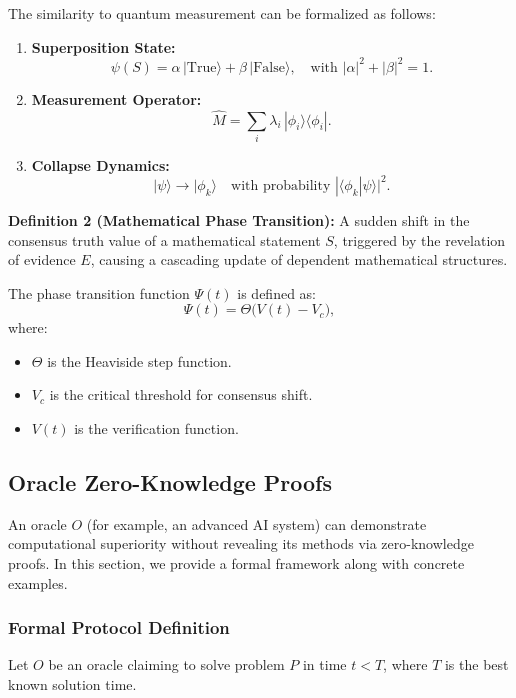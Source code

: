 \documentclass[11pt]{article}
\begin{document}
The similarity to quantum measurement can be formalized as follows:
\begin{enumerate}[label=(\arabic*)]
    \item \textbf{Superposition State:} 
    \[
    \psi(S) = \alpha\,| \text{True} \rangle + \beta\,| \text{False} \rangle, \quad \text{with } |\alpha|^2 + |\beta|^2 = 1.
    \]
    \item \textbf{Measurement Operator:} 
    \[
    \hat{M} = \sum_i \lambda_i \, |\phi_i\rangle\langle \phi_i|.
    \]
    \item \textbf{Collapse Dynamics:} 
    \[
    |\psi\rangle \to |\phi_k\rangle \quad \text{with probability } |\langle\phi_k|\psi\rangle|^2.
    \]
\end{enumerate}

\noindent
\textbf{Definition 2 (Mathematical Phase Transition):} A sudden shift in the consensus truth value of a mathematical statement $S$, triggered by the revelation of evidence $E$, causing a cascading update of dependent mathematical structures.

The phase transition function $\Psi(t)$ is defined as:
\[
\Psi(t) = \Theta\bigl(V(t)-V_c\bigr),
\]
where:
\begin{itemize}
    \item $\Theta$ is the Heaviside step function.
    \item $V_c$ is the critical threshold for consensus shift.
    \item $V(t)$ is the verification function.
\end{itemize}

\subsection{Oracle Zero-Knowledge Proofs}

An oracle $O$ (for example, an advanced AI system) can demonstrate computational superiority without revealing its methods via zero-knowledge proofs. In this section, we provide a formal framework along with concrete examples.

\subsubsection{Formal Protocol Definition}

Let $O$ be an oracle claiming to solve problem $P$ in time $t < T$, where $T$ is the best known solution time.
\end{document}
